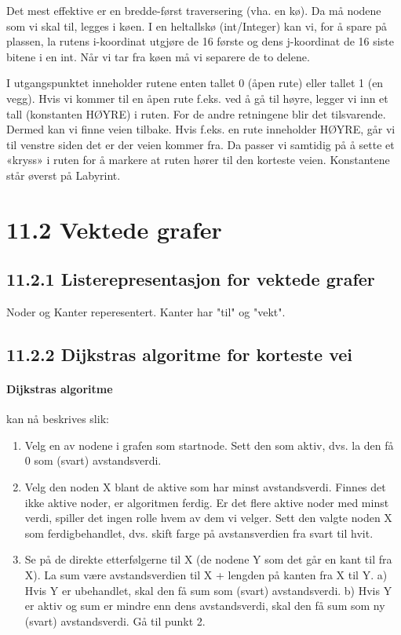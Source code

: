 \documentclass[11pt]{article}
\begin{document}
        Det mest effektive er en bredde-først traversering (vha. en kø). Da må nodene som vi skal til,
        legges i køen. I en heltallskø (int/Integer) kan vi, for å spare på plassen, la rutens i-koordinat
        utgjøre de 16 første og dens j-koordinat de 16 siste bitene i en int. Når vi tar fra køen må vi
        separere de to delene.

        I utgangspunktet inneholder rutene enten tallet 0 (åpen rute) eller tallet 1 (en vegg). Hvis vi
        kommer til en åpen rute f.eks. ved å gå til høyre, legger vi inn et tall (konstanten HØYRE) i
        ruten. For de andre retningene blir det tilsvarende. Dermed kan vi finne veien tilbake. Hvis
        f.eks. en rute inneholder HØYRE, går vi til venstre siden det er der veien kommer fra. Da
        passer vi samtidig på å sette et «kryss» i ruten for å markere at ruten hører til den korteste
        veien. Konstantene står øverst på Labyrint.

\newpage
\section{11.2 Vektede grafer}

    \subsection{11.2.1 Listerepresentasjon for vektede grafer}
        Noder og Kanter reperesentert. Kanter har "til" og "vekt".

    \subsection{11.2.2 Dijkstras algoritme for korteste vei}
        \paragraph{Dijkstras algoritme} kan nå beskrives slik:
        \begin{enumerate}
            \item  Velg en av nodene i grafen som startnode. Sett den som aktiv, dvs. la den få 0 som
                (svart) avstandsverdi.
            \item Velg den noden X blant de aktive som har minst avstandsverdi. Finnes det ikke aktive
                noder, er algoritmen ferdig. Er det flere aktive noder med minst verdi, spiller det ingen
                rolle hvem av dem vi velger. Sett den valgte noden X som ferdigbehandlet, dvs. skift
                farge på avstansverdien fra svart til hvit.
            \item  Se på de direkte etterfølgerne til X (de nodene Y som det går en kant til fra X). La sum
                være avstandsverdien til X + lengden på kanten fra X til Y. a) Hvis Y er ubehandlet,
                skal den få sum som (svart) avstandsverdi. b) Hvis Y er aktiv og sum er mindre enn
                dens avstandsverdi, skal den få sum som ny (svart) avstandsverdi. Gå til punkt 2.
        \end{enumerate}
\end{document}
